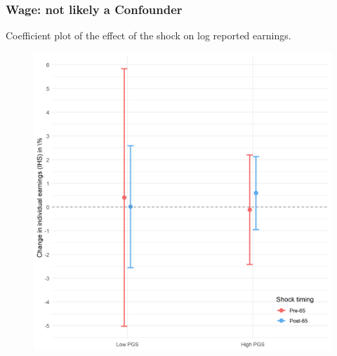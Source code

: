 \documentclass[10pt,compress,xcolor=dvipsnames]{beamer}    %
\newcounter{ex}
\newcommand{\1}[1]{\mathrm{1\hspace*{-2.5pt}l}[#1]}	%
\begin{document}
\begin{frame}
\frametitle{Wage: not likely a Confounder}
Coefficient plot of the effect of the shock on log reported earnings.
\begin{figure}[hbtp]
\centering
\includegraphics[height=0.8\textheight]{../../3_output/shock_effects/IHSwage_6070_100_cvplot.png}
\label{fig:wage}
\end{figure}
\end{frame}
\end{document}
